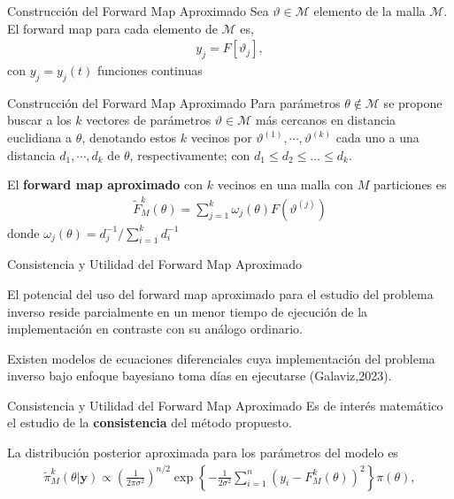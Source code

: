\documentclass[10pt,aspectratio=169]{beamer}
\begin{document}
\begin{frame}{Construcción del Forward Map Aproximado}
  Sea $\vartheta \in \mathcal{M} $ elemento de la malla $\mathcal{M}$. El forward map para cada elemento de $\mathcal{M}$ es, 
  \begin{align*}
    y_j = F[\vartheta_j],
  \end{align*}
  con $y_j = y_j(t)$ funciones continuas
  
  
\end{frame}

\begin{frame}{Construcción del Forward Map Aproximado}
  Para parámetros $\theta \notin \mathcal{M}$ se propone buscar a los $k$ vectores de parámetros $\vartheta \in \mathcal{M}$ más cercanos en distancia euclidiana a $\theta$, denotando estos $k$ vecinos por $\vartheta^{(1)}, \cdots, \vartheta^{(k)}$ cada uno a una distancia $d_1, \cdots, d_k$ de $\theta$, respectivamente; con $d_1 \leq d_2 \leq \dots \leq d_k$. 
  
  \vspace{0.5 cm}

  El \textbf{forward map aproximado} con $k$ vecinos en una malla con $M$ particiones es
  \begin{align}
    \tilde{F}^{k}_M(\theta) = \sum_{j = 1}^{k} \omega_j(\theta) F \left(\vartheta^{(j)}\right)
    \label{2.4.01}
  \end{align}
  donde $\omega_j(\theta) = d_j^{-1}/ \sum_{i=1}^{k} d_i^{-1}$
\end{frame}

\begin{frame}{Consistencia y Utilidad del Forward Map Aproximado}

  El potencial del uso del forward map aproximado para el estudio del problema inverso reside parcialmente en un menor tiempo de ejecución de la implementación en contraste con su análogo ordinario. 

  \vspace{0.5 cm}

  Existen modelos de ecuaciones diferenciales cuya implementación del problema inverso bajo enfoque bayesiano toma días en ejecutarse (Galaviz,2023).

  
\end{frame}


\begin{frame}{Consistencia y Utilidad del Forward Map Aproximado}
  Es de interés matemático el estudio de la \textbf{consistencia} del método propuesto.
  
  \vspace{0.5 cm}

  La distribución posterior aproximada para los parámetros del modelo es
  \begin{align}
    \tilde{\pi}^{k}_M(\theta|\mathbf{y}) \propto \left(\frac{1}{2\pi \sigma^2}\right) ^{n/2}\exp \left \{  -\frac{1}{2\sigma^2}\sum_{i = 1}^{n} \left(y_i - F^k_M(\theta)\right)^2 \right \}\pi(\theta),
    \label{2.4.02}
  \end{align}
\end{frame}
\end{document}
